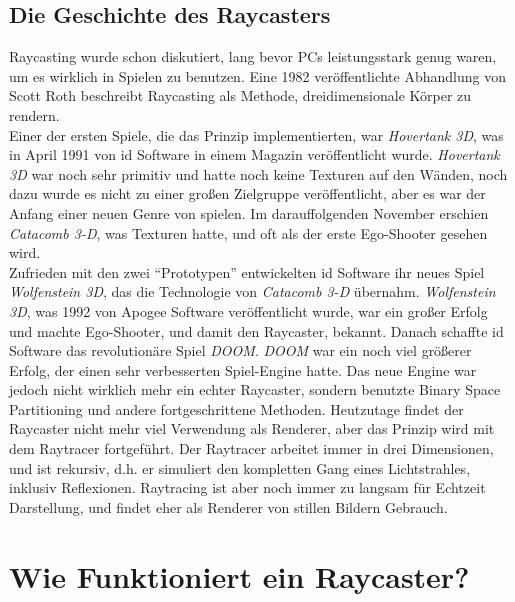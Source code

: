 \documentclass[a4paper,11pt]{report}
\begin{document}
\subsection{Die Geschichte des Raycasters}
Raycasting wurde schon diskutiert, lang bevor PCs leistungsstark genug waren, um es wirklich in Spielen zu benutzen. Eine 1982 veröffentlichte Abhandlung von Scott Roth beschreibt Raycasting als Methode, dreidimensionale Körper zu rendern. \\
Einer der ersten Spiele, die das Prinzip implementierten, war \textit{Hovertank 3D}, was in April 1991 von id Software in einem Magazin veröffentlicht wurde. \textit{Hovertank 3D} war noch sehr primitiv und hatte noch keine Texturen auf den Wänden, noch dazu wurde es nicht zu einer großen Zielgruppe veröffentlicht, aber es war der Anfang einer neuen Genre von spielen. Im darauffolgenden November erschien \textit{Catacomb 3-D}, was Texturen hatte, und oft als der erste Ego-Shooter gesehen wird. \\
Zufrieden mit den zwei ``Prototypen'' entwickelten id Software ihr neues Spiel \textit{Wolfenstein 3D}, das die Technologie von \textit{Catacomb 3-D} übernahm. \textit{Wolfenstein 3D}, was 1992 von Apogee Software veröffentlicht wurde, war ein großer Erfolg und machte Ego-Shooter, und damit den Raycaster, bekannt. Danach schaffte id Software das revolutionäre Spiel \textit{DOOM}. \textit{DOOM} war ein noch viel größerer Erfolg, der einen sehr verbesserten Spiel-Engine hatte. Das neue Engine war jedoch nicht wirklich mehr ein echter Raycaster, sondern benutzte Binary Space Partitioning und andere fortgeschrittene Methoden. Heutzutage findet der Raycaster nicht mehr viel Verwendung als Renderer, aber das Prinzip wird mit dem Raytracer fortgeführt. Der Raytracer arbeitet immer in drei Dimensionen, und ist rekursiv, d.h. er simuliert den kompletten Gang eines Lichtstrahles, inklusiv Reflexionen. Raytracing ist aber noch immer zu langsam für Echtzeit Darstellung, und findet eher als Renderer von stillen Bildern Gebrauch.

\section{Wie Funktioniert ein Raycaster?}
\end{document}
